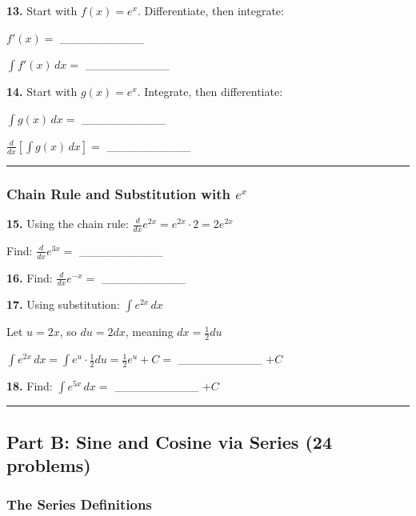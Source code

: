 \documentclass[
  11pt,
]{article}
\begin{document}
\textbf{13.} Start with \(f(x) = e^x\). Differentiate, then integrate:

\(f'(x) ={}\) \_\_\_\_\_\_\_\_\_\_

\(\int f'(x) \, dx ={}\) \_\_\_\_\_\_\_\_\_\_

\textbf{14.} Start with \(g(x) = e^x\). Integrate, then differentiate:

\(\int g(x) \, dx ={}\) \_\_\_\_\_\_\_\_\_\_

\(\frac{d}{dx}\left[\int g(x) \, dx\right] ={}\) \_\_\_\_\_\_\_\_\_\_

\begin{center}\rule{0.5\linewidth}{0.5pt}\end{center}

\hypertarget{chain-rule-and-substitution-with-ex}{%
\subsubsection{\texorpdfstring{Chain Rule and Substitution with
\(e^x\)}{Chain Rule and Substitution with e\^{}x}}\label{chain-rule-and-substitution-with-ex}}

\textbf{15.} Using the chain rule:
\(\frac{d}{dx}e^{2x} = e^{2x} \cdot 2 = 2e^{2x}\)

Find: \(\frac{d}{dx}e^{3x} ={}\) \_\_\_\_\_\_\_\_\_\_

\textbf{16.} Find: \(\frac{d}{dx}e^{-x} ={}\) \_\_\_\_\_\_\_\_\_\_

\textbf{17.} Using substitution: \(\int e^{2x} \, dx\)

Let \(u = 2x\), so \(du = 2dx\), meaning \(dx = \frac{1}{2}du\)

\(\int e^{2x} \, dx = \int e^u \cdot \frac{1}{2} du = \frac{1}{2}e^u + C ={}\)
\_\_\_\_\_\_\_\_\_\_ \(+ C\)

\textbf{18.} Find: \(\int e^{5x} \, dx ={}\) \_\_\_\_\_\_\_\_\_\_
\(+ C\)

\begin{center}\rule{0.5\linewidth}{0.5pt}\end{center}

\hypertarget{part-b-sine-and-cosine-via-series-24-problems}{%
\subsection{Part B: Sine and Cosine via Series (24
problems)}\label{part-b-sine-and-cosine-via-series-24-problems}}

\hypertarget{the-series-definitions}{%
\subsubsection{The Series Definitions}\label{the-series-definitions}}
\end{document}
